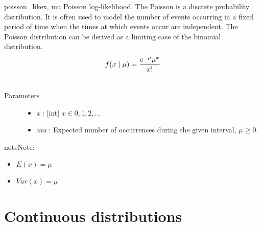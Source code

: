 \hypertarget{pymc.distributions.poisson_like}{}\begin{funcdesc}{poisson\_like}{x, mu}
Poisson log-likelihood. The Poisson is a discrete probability distribution.
It is often used to model the number of events occurring in a fixed period of
time when the times at which events occur are independent. The Poisson
distribution can be derived as a limiting case of the binomial distribution.
\begin{gather}
\begin{split}f(x \mid \mu) = \frac{e^{-\mu}\mu^x}{x!}\end{split}\notag\\\begin{split}\end{split}\notag
\end{gather}\begin{description}
\item[Parameters] \leavevmode\begin{itemize}
\item {}
\emph{x} : {[}int{]} $x \in {0,1,2,...}$

\item {}
\emph{mu} : Expected number of occurrences during the given interval, $\mu \geq 0$.

\end{itemize}

\end{description}

\begin{notice}{note}{Note:}\begin{itemize}
\item {}
$E(x)=\mu$

\item {}
$Var(x)=\mu$

\end{itemize}
\end{notice}
\end{funcdesc}


\section{Continuous distributions}

